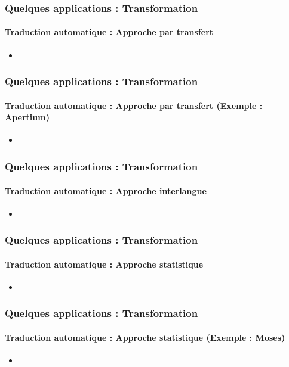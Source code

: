\documentclass[xcolor=table]{beamer}
\begin{document}
\begin{frame}
	\frametitle{Quelques applications : Transformation}
	\framesubtitle{Traduction automatique : Approche par transfert}
	\begin{itemize}
		\item 
	\end{itemize}
\end{frame}

\begin{frame}
	\frametitle{Quelques applications : Transformation}
	\framesubtitle{Traduction automatique : Approche par transfert (Exemple : Apertium)}
	\begin{itemize}
		\item 
	\end{itemize}
\end{frame}

\begin{frame}
	\frametitle{Quelques applications : Transformation}
	\framesubtitle{Traduction automatique : Approche interlangue}
	\begin{itemize}
		\item 
	\end{itemize}
\end{frame}


\begin{frame}
	\frametitle{Quelques applications : Transformation}
	\framesubtitle{Traduction automatique : Approche statistique}
	\begin{itemize}
		\item 
	\end{itemize}
\end{frame}

\begin{frame}
	\frametitle{Quelques applications : Transformation}
	\framesubtitle{Traduction automatique : Approche statistique (Exemple : Moses)}
	\begin{itemize}
		\item 
	\end{itemize}
\end{frame}
\end{document}
